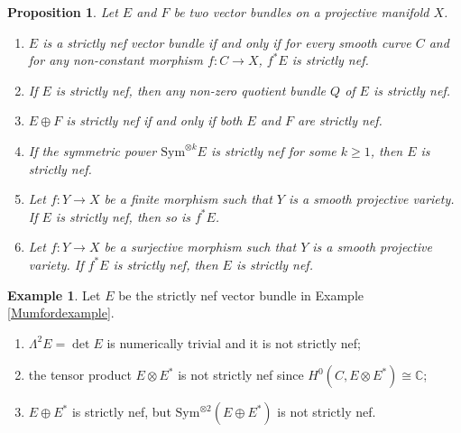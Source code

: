 \documentclass[english,reqno]{amsart}
\newcommand\bbC{{\mathbb C}}
\theoremstyle{plain}
\newtheorem{prop}[thm]{Proposition}
\theoremstyle{definition}
\newtheorem{example}[thm]{Example}
\numberwithin{equation}{section} %
\begin{document}
\begin{prop}\label{basicproperties} Let $E$ and $F$ be two
vector bundles on a projective manifold $X$.
\begin{enumerate}
\item $E$ is a  strictly nef vector bundle if and only if for every smooth  curve
$C$ and for any non-constant morphism $f: C\rightarrow X$,    $f^*E$ is strictly nef.



\item If $E$ is  strictly nef, then any non-zero quotient bundle $Q$ of $E$ is  strictly nef.

\item $E\oplus F$  is  strictly nef if and only if both $E$ and $F$ are
strictly nef.



\item If the symmetric power $\mathrm{Sym}^{\otimes k} E$ is  strictly nef for some $k\geq 1$, then $E$ is  strictly nef.

\item Let  $f:Y\rightarrow X$ be  a  finite morphism such that  $Y$ is a  smooth projective variety. If $E$ is strictly nef, then so  is $f^*E$.

\item Let  $f:Y\rightarrow X$ be  a  surjective morphism such that  $Y$ is a  smooth projective variety. If $f^*E$ is strictly nef, then  $E$ is  strictly nef.

\end{enumerate}\end{prop}



\begin{example} Let $E$ be the strictly nef vector bundle  in Example \ref{Mumfordexample}.
    \begin{enumerate}
        \item  $\Lambda^2E=\det E$ is numerically trivial and it is not strictly nef;
        \item the tensor product $E\otimes E^*$ is not strictly nef since $H^0(C,E\otimes E^*)\cong \bbC$;

        \item  $ E\oplus E^*$ is strictly nef, but  $\mathrm{Sym}^{\otimes 2}(E\oplus E^*)$ is not strictly nef. %
    \end{enumerate}


\end{example}
\end{document}
